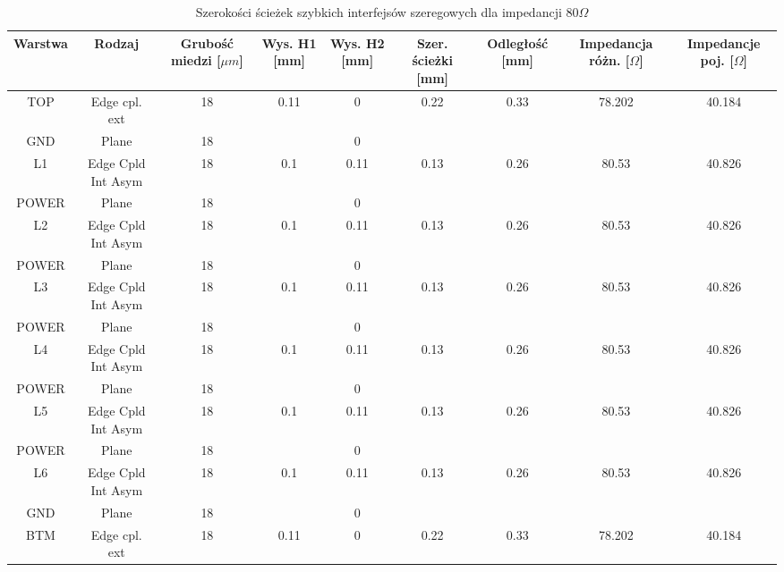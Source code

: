 \begin{sidewaystable}[h]
    \scriptsize
	\caption{Szerokości ścieżek szybkich interfejsów szeregowych dla impedancji $80 \Omega$}
 \begin{tabular}{c  | c |  c | c |c | c | c  | c  | c}
\hline
    \textbf{Warstwa} & \textbf{Rodzaj} & \textbf{Grubość miedzi [$\mu m$]} & \textbf{Wys. H1 [mm]} & \textbf{Wys. H2 [mm]} & \textbf{Szer. ścieżki [mm]}  & \textbf{Odległość [mm]}   & \textbf{Impedancja różn. [$\Omega$]}   & \textbf{Impedancje poj. [$\Omega$]}\\

    \hline
    \hline
    TOP 	& 	Edge cpl. ext 		&	18	&	0.11	&	0	& 	0.22	&	0.33	&	78.202	&	40.184	\\
    GND 	& 	Plane		 		&	18	&		&	0	& 		&		&			&			\\	
    L1 		& 	Edge Cpld Int Asym 	&	18	&	0.1	&	0.11	& 	0.13	&	0.26	&	80.53		&	40.826	\\
    POWER 	& 	Plane		 		&	18	&		&	0	& 		&		&			&			\\
    L2		& 	Edge Cpld Int Asym 	&	18	&	0.1	&	0.11	& 	0.13	&	0.26	&	80.53		&	40.826	\\
    POWER 	& 	Plane		 		&	18	&		&	0	& 		&		&			&			\\
    L3		& 	Edge Cpld Int Asym 	&	18	&	0.1	&	0.11	& 	0.13	&	0.26	&	80.53		&	40.826	\\
    POWER 	& 	Plane		 		&	18	&		&	0	& 		&		&			&			\\
    L4		& 	Edge Cpld Int Asym 	&	18	&	0.1	&	0.11	& 	0.13	&	0.26	&	80.53		&	40.826	\\
    POWER 	& 	Plane		 		&	18	&		&	0	& 		&		&			&			\\
    L5 		& 	Edge Cpld Int Asym 	&	18	&	0.1	&	0.11	& 	0.13	&	0.26	&	80.53		&	40.826	\\
    POWER 	& 	Plane		 		&	18	&		&	0	& 		&		&			&			\\
    L6 		& 	Edge Cpld Int Asym 	&	18	&	0.1	&	0.11	& 	0.13	&	0.26	&	80.53		&	40.826	\\
    GND 	& 	Plane		 		&	18	&		&	0	& 		&		&			&			\\
    BTM 	& 	Edge cpl. ext 		&	18	&	0.11	&	0	& 	0.22	&	0.33	&	78.202	&	40.184	\\
    
	\toprule
    \end{tabular}

\end{sidewaystable}

